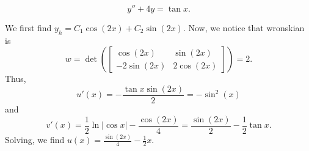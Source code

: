 \begin{example}
    $$y''+4y = \tan x.$$
\end{example}
\begin{soln}
    We first find $y_h = C_1\cos(2x)+C_2\sin(2x)$. Now, we notice that
    wronskian is 
    $$w = \det \left( \begin{bmatrix}\cos(2x)&\sin(2x) \\ -2\sin(2x) & 2\cos(2x) \end{bmatrix}\right)
    =2.$$ Thus, $$u'(x) = -\frac{\tan x \sin (2x)}{2} = -\sin^2(x)$$
    and $$v'(x) = \frac{1}{2}\ln |\cos x| - \frac{\cos(2x)}{4} = \frac{\sin(2x)}{2}-\frac{1}{2}\tan x.$$
    Solving, we find $u(x) = \frac{\sin(2x)}{4} - \frac{1}{2}x$.
\end{soln}


